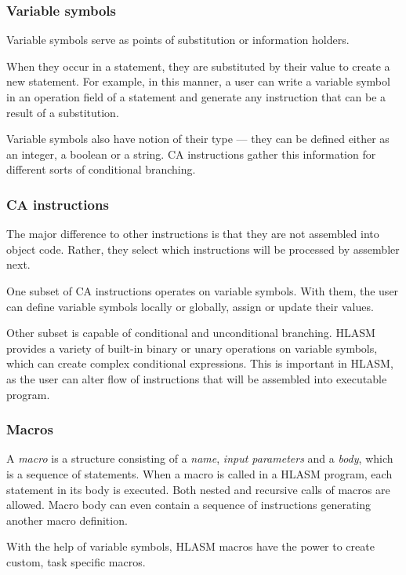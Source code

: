 \subsubsection{Variable symbols}

Variable symbols serve as points of substitution or information holders. 

When they occur in a statement, they are substituted by their value to create a new statement. For example, in this manner, a user can write a variable symbol in an operation field of a statement and generate any instruction that can be a result of a substitution.

Variable symbols also have notion of their type --- they can be defined either as an integer, a boolean or a string. CA instructions gather this information for different sorts of conditional branching.

\subsubsection{CA instructions}

The major difference to other instructions is that they are not assembled into object code. Rather, they select which instructions will be processed by assembler next.

One subset of CA instructions operates on variable symbols. With them, the user can define variable symbols locally or globally, assign or update their values.

Other subset is capable of conditional and unconditional branching. HLASM provides a variety of built-in binary or unary operations on variable symbols, which can create complex conditional expressions. This is important in HLASM, as the user can alter flow of instructions that will be assembled into executable program.

\subsubsection{Macros}

A \emph{macro} is a structure consisting of a \emph{name}, \emph{input parameters} and a \emph{body}, which is a sequence of statements. When a macro is called in a HLASM program, each statement in its body is executed. Both nested and recursive calls of macros are allowed. Macro body can even contain a sequence of instructions generating another macro definition.

With the help of variable symbols, HLASM macros have the power to create custom, task specific macros.

